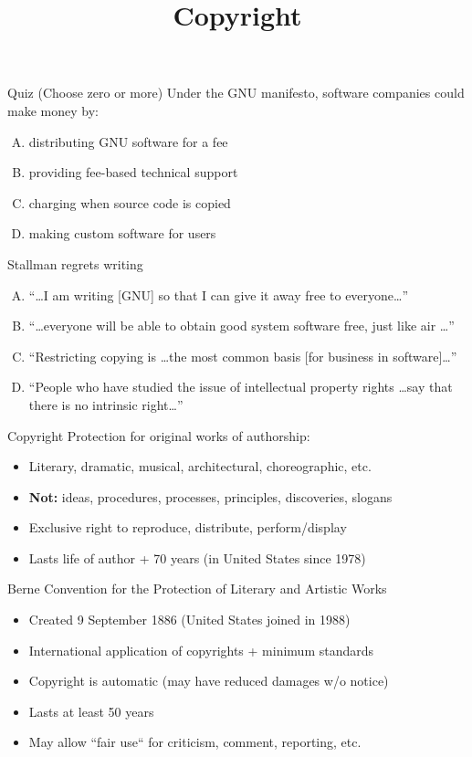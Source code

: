 \documentclass{beamer}
\title{Copyright}
\date{}
\begin{document}
\begin{frame}
\titlepage
\end{frame}

\begin{frame}{Quiz \hfill (Choose zero or more)}
Under the GNU manifesto, software companies could make money by:
\begin{enumerate}[(A)]
\item<1-2> distributing GNU software for a fee
\item<1-2> providing fee-based technical support
\item<1> charging when source code is copied
\item<1-2> making custom software for users
\end{enumerate}
\medskip
Stallman regrets writing
\begin{enumerate}[(A)]
\item<1-2> ``\ldots I am writing [GNU] so that I can give it away free to everyone\ldots''
\item<1-2> ``\ldots everyone will be able to obtain good system software free, just like air \ldots''
\item<1-2> ``Restricting copying is \ldots the most common basis [for business in software]\ldots''
\item<1-2> ``People who have studied the issue of intellectual property rights \ldots say that there is no intrinsic right\ldots''
\end{enumerate}
\end{frame}

\begin{frame}{Copyright}
Protection for original works of authorship:
\begin{itemize}
\item Literary, dramatic, musical, architectural, choreographic, etc.
\item \textbf{Not:} ideas, procedures, processes, principles, discoveries, slogans
\item Exclusive right to reproduce, distribute, perform/display
\item Lasts life of author + 70 years (in United States since 1978)
\end{itemize}
\bigskip
Berne Convention for the Protection of Literary and Artistic Works
\begin{itemize}
\item Created 9 September 1886 (United States joined in 1988)
\item International application of copyrights + minimum standards 
\item Copyright is automatic (may have reduced damages w/o notice)
\item Lasts at least 50 years
\item May allow ``fair use`` for criticism, comment, reporting, etc.
\end{itemize}
\end{frame}
\end{document}
